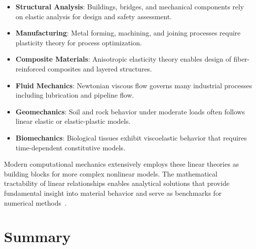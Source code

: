 \begin{itemize}
\item \textbf{Structural Analysis}: Buildings, bridges, and mechanical components rely on elastic analysis for design and safety assessment.
\item \textbf{Manufacturing}: Metal forming, machining, and joining processes require plasticity theory for process optimization.
\item \textbf{Composite Materials}: Anisotropic elasticity theory enables design of fiber-reinforced composites and layered structures.
\item \textbf{Fluid Mechanics}: Newtonian viscous flow governs many industrial processes including lubrication and pipeline flow.
\item \textbf{Geomechanics}: Soil and rock behavior under moderate loads often follows linear elastic or elastic-plastic models.
\item \textbf{Biomechanics}: Biological tissues exhibit viscoelastic behavior that requires time-dependent constitutive models.
\end{itemize}

Modern computational mechanics extensively employs these linear theories as building blocks for more complex nonlinear models. The mathematical tractability of linear relationships enables analytical solutions that provide fundamental insight into material behavior and serve as benchmarks for numerical methods~\autocite{Sadd.2019}.

\section{Summary}

